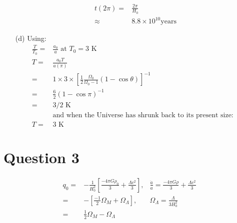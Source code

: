 \documentclass[10pt,a4paper]{article}
\begin{document}
\begin{itemize}
\begin{align*}
	t(2\pi) =& \frac{2\pi}{H_{0}} \\
		  \approx& 8.8 \times 10^{10} \mbox{years}
	\end{align*}
	\item[(d)] Using:
	\begin{align*}
	\frac{T}{T_{0}} =& \frac{a_{0}}{a} \mbox{ at $T_{0} = 3$ K} &\\
	T =& \frac{a_{0}T}{a(\pi)} &\\
	  =& 1 \times 3 \times [\frac{1}{2}\frac{\Omega_{0}}{\Omega_{0} -1} (1 - \cos \theta)]^{-1} &\\
	  =& \frac{6}{2}(1 - \cos \pi)^{-1} &\\
	  =& 3/2 \mbox{ K}&\\
	  &\mbox{and when the Universe has shrunk back to its present size:} &\\
	  T =& 3 \mbox{ K}	
	\end{align*}
\end{itemize}

\section*{Question 3}
\begin{eqnarray*}
	q_{0} =& -\frac{1}{H_{0}^{2}}[\frac{-4\pi G \rho_{0}}{3} + \frac{\Lambda c^{2}}{3}], &\frac{\ddot a}{a} = \frac{-4\pi G \rho}{3} + \frac{\Lambda c^{2}}{3} \\
	=& -[\frac{-1}{2}\Omega_{M} + \Omega_{\Lambda}], &\Omega_{\Lambda} = \frac{\Lambda}{3H_{0}^{2}} \\
	=& \frac{1}{2}\Omega_{M} - \Omega_{\Lambda} &
\end{eqnarray*}
\end{document}
